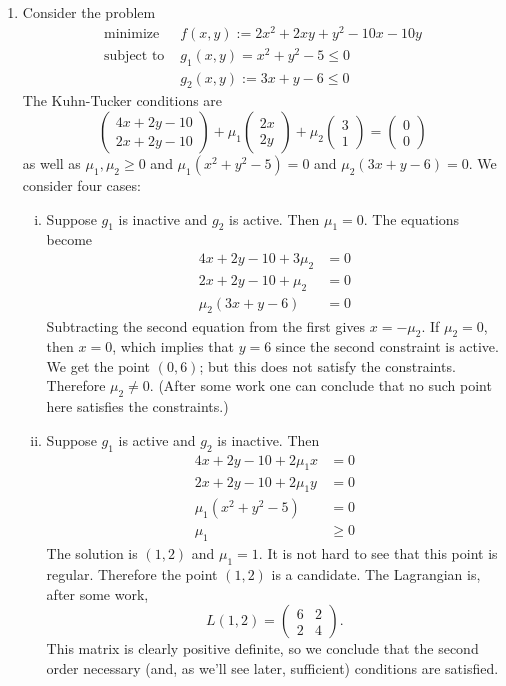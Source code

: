 \documentclass[11pt]{article}
\begin{document}
\begin{enumerate}
\item
Consider the problem
\begin{align*}
\text{minimize } &f(x,y) := 2x^2 + 2xy + y^2 - 10x - 10y \\
\text{subject to } &g_1(x,y) = x^2+y^2-5 \leq 0 \\
&g_2(x,y) := 3x+y-6 \leq 0
\end{align*}
The Kuhn-Tucker conditions are
\[
\begin{pmatrix}
4x+2y-10 \\ 2x+2y-10
\end{pmatrix} + \mu_1 \begin{pmatrix}
2x \\ 2y
\end{pmatrix} + \mu_2 \begin{pmatrix}
3 \\ 1
\end{pmatrix} = \begin{pmatrix}
0 \\ 0
\end{pmatrix}
\]
as well as $\mu_1, \mu_2 \geq 0$ and $\mu_1 (x^2+y^2-5) = 0$ and $\mu_2 (3x+y - 6) = 0$. We consider four cases:
\begin{enumerate}[(i)]
\item
Suppose $g_1$ is inactive and $g_2$ is active. Then $\mu_1 = 0$. The equations become
\begin{align*}
4x + 2y - 10  + 3\mu_2 &= 0 \\
2x + 2y - 10 + \mu_2 &= 0 \\
\mu_2 (3x+y-6) &= 0
\end{align*}
Subtracting the second equation from the first gives $x =- \mu_2$. If $\mu_2 = 0$, then $x = 0$, which implies that $y = 6$ since the second constraint is active. We get the point $(0,6)$; but this does not satisfy the constraints. Therefore $\mu_2 \neq 0$. (After some work one can conclude that no such point here satisfies the constraints.) 

\item
Suppose $g_1$ is active and $g_2$ is inactive. Then
\begin{align*}
4x + 2y - 10 + 2\mu_1 x &= 0 \\
2x + 2y - 10 + 2\mu_1 y &= 0 \\
\mu_1(x^2+y^2-5) &= 0 \\
\mu_1 &\geq 0
\end{align*}
The solution is $(1,2)$ and $\mu_1 = 1$. It is not hard to see that this point is regular. Therefore the point $(1,2)$ is a candidate. The Lagrangian is, after some work, 
\[
L(1,2) = \begin{pmatrix}
6 & 2 \\ 2 & 4
\end{pmatrix}.
\]
This matrix is clearly positive definite, so we conclude that the second order necessary (and, as we'll see later, sufficient) conditions are satisfied.


\end{enumerate}
\end{enumerate}
\end{document}
